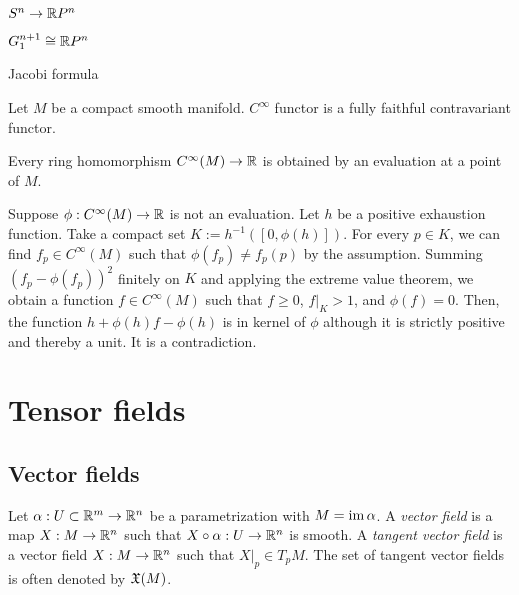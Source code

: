 \documentclass{../../large}
\renewcommand{\a}{\alpha}
\begin{document}
\begin{prb}
$S^n\to\mathbb{R} P^n$
\end{prb}
\begin{prb}
$G_1^{n+1}\cong\mathbb{R} P^n$
\end{prb}
\begin{prb}
\end{prb}
\begin{prb}
Jacobi formula
\end{prb}
\begin{prb}
Let $M$ be a compact smooth manifold.
$C^\infty$ functor is a fully faithful contravariant functor.
\begin{parts}
\item Every ring homomorphism $C^\infty(M)\to\mathbb{R}$ is obtained by an evaluation at a point of $M$.
\end{parts}
\end{prb}
\begin{pf}
Suppose $\phi:C^\infty(M)\to\mathbb{R}$ is not an evaluation.
Let $h$ be a positive exhaustion function.
Take a compact set $K:=h^{-1}([0,\phi(h)])$.
For every $p\in K$, we can find $f_p\in C^\infty(M)$ such that $\phi(f_p)\ne f_p(p)$ by the assumption.
Summing $(f_p-\phi(f_p))^2$ finitely on $K$ and applying the extreme value theorem, we obtain a function $f\in C^\infty(M)$ such that $f\ge0$, $f|_K>1$, and $\phi(f)=0$.
Then, the function $h+\phi(h)f-\phi(h)$ is in kernel of $\phi$ although it is strictly positive and thereby a unit.
It is a contradiction.
\end{pf}









\chapter{Tensor fields}

\section{Vector fields}

\begin{prb}
Let $\a:U\subset\R^m\to\R^n$ be a parametrization with $M=\im\a$.
A \emph{vector field} is a map $X:M\to\mathbb{R}^n$ such that $X\circ\a:U\to\R^n$ is smooth.
A \emph{tangent vector field} is a vector field $X:M\to\mathbb{R}^n$ such that $X|_p\in T_pM$.
The set of tangent vector fields is often denoted by $\mathfrak{X}(M)$.
\end{prb}
\end{document}
